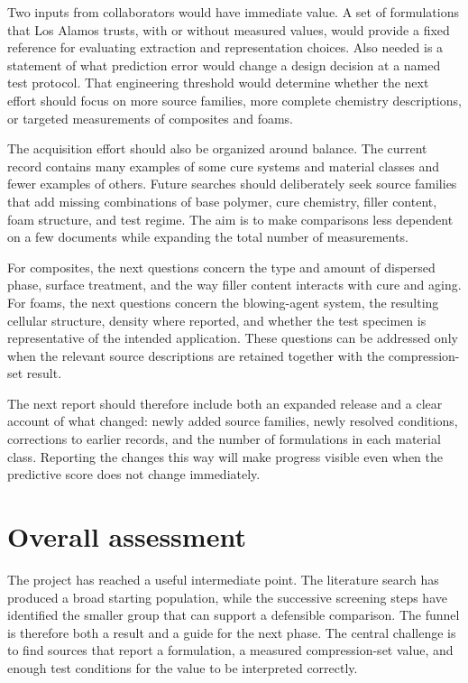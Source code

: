 \documentclass[10pt]{article}
\begin{document}
Two inputs from collaborators would have immediate value. A set of
formulations that Los Alamos trusts, with or without measured values, would
provide a fixed reference for evaluating extraction and representation choices.
Also needed is a statement of what prediction error would change a design
decision at a named test protocol. That engineering threshold would determine
whether the next effort should focus on more source families, more complete
chemistry descriptions, or targeted measurements of composites and foams.

The acquisition effort should also be organized around balance. The current
record contains many examples of some cure systems and material classes and
fewer examples of others. Future searches should deliberately seek source
families that add missing combinations of base polymer, cure chemistry, filler
content, foam structure, and test regime. The aim is to make comparisons less
dependent on a few documents while expanding the total number of measurements.

For composites, the next questions concern the type and amount of dispersed
phase, surface treatment, and the way filler content interacts with cure and
aging. For foams, the next questions concern the blowing-agent system, the
resulting cellular structure, density where reported, and whether the test
specimen is representative of the intended application. These questions can be
addressed only when the relevant source descriptions are retained together
with the compression-set result.

The next report should therefore include both an expanded release and a clear
account of what changed: newly added source families, newly resolved
conditions, corrections to earlier records, and the number of formulations in
each material class. Reporting the changes this way will make progress visible
even when the predictive score does not change immediately.

\section{Overall assessment}
The project has reached a useful intermediate point. The literature search has
produced a broad starting population, while the successive screening steps have
identified the smaller group that can support a defensible comparison. The
funnel is therefore both a result and a guide for the next phase. The central
challenge is to find sources that report a formulation, a measured
compression-set value, and enough test conditions for the value to be
interpreted correctly.
\end{document}
